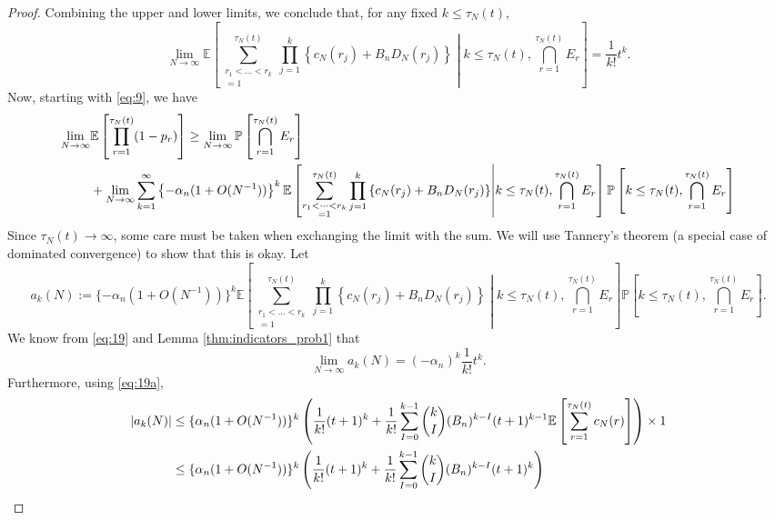 \documentclass{article}
\newcommand{\Prob}{\mathbb{P}}
\newcommand{\E}{\mathbb{E}}
\newcommand{\1}[1]{\mathbbm{1}_{#1}}
\begin{document}
\begin{proof}
Combining the upper and lower limits, we conclude that, for any fixed $k\leq \tau_N(t)$,
\begin{equation}\label{eq:19}
\lim_{N\to\infty} \E \left[ \sum_{\substack{r_1<\dots<r_k \\ =1}}^{\tau_N(t)}\prod_{j=1}^k 
\left\{ c_N(r_j) + B_n D_N(r_j) \right\} 
\middle| k\leq\tau_N(t), \bigcap_{r=1}^{\tau_N(t)} E_r \right]
= \frac{1}{k!} t^k .
\end{equation}
Now, starting with \eqref{eq:9}, we have
\begin{align}\label{eq:21a}
\lim_{N\to\infty} &\E \left[ \prod_{r=1}^{\tau_N(t)} (1-p_r) \right]
\geq \lim_{N\to\infty} \Prob \left[ \bigcap_{r=1}^{\tau_N(t)} E_r \right] \notag\\
&+ \lim_{N\to\infty} \sum_{k=1}^\infty \left\{ -\alpha_n (1+ O(N^{-1})) \right\}^k 
\E \left[ \sum_{\substack{r_1<\dots<r_k \\ =1}}^{\tau_N(t)}\prod_{j=1}^k 
\left\{ c_N(r_j) + B_n D_N(r_j) \right\} \middle| k\leq\tau_N(t), \bigcap_{r=1}^{\tau_N(t)} E_r \right]
\Prob \left[ k \leq \tau_N(t) , \bigcap_{r=1}^{\tau_N(t)} E_r \right]
\end{align}
Since $\tau_N(t) \to \infty$, some care must be taken when exchanging the limit with the sum. We will use Tannery's theorem (a special case of dominated convergence) to show that this is okay.
Let 
\begin{equation}
a_k(N) := \{ -\alpha_n (1+ O(N^{-1})) \}^k 
\E \left[ \sum_{\substack{r_1<\dots<r_k \\ =1}}^{\tau_N(t)}\prod_{j=1}^k 
\left\{ c_N(r_j) + B_n D_N(r_j) \right\} \middle| k\leq\tau_N(t), \bigcap_{r=1}^{\tau_N(t)} E_r \right]
\Prob \left[ k \leq \tau_N(t) , \bigcap_{r=1}^{\tau_N(t)} E_r \right] .
\end{equation}
We know from \eqref{eq:19} and Lemma \ref{thm:indicators_prob1} that
\begin{equation}
\lim_{N\to\infty} a_k(N) = (-\alpha_n)^k \frac{1}{k!}t^k .
\end{equation}
Furthermore, using \eqref{eq:19a},
\begin{align}
|a_k(N)| 
&\leq \{ \alpha_n (1+ O(N^{-1})) \}^k 
\left( \frac{1}{k!} (t+1)^k + \frac{1}{k!} \sum_{I=0}^{k-1} \binom{k}{I} (B_n)^{k-I} (t+1)^{k-1} \E \left[ \sum_{r=1}^{\tau_N(t)} c_N(r) \right] \right) \times 1 \notag\\
&\leq \{ \alpha_n (1+ O(N^{-1})) \}^k 
\left( \frac{1}{k!} (t+1)^k + \frac{1}{k!} \sum_{I=0}^{k-1} \binom{k}{I} (B_n)^{k-I} (t+1)^k \right) \notag\\

\end{align}
\end{proof}
\end{document}
